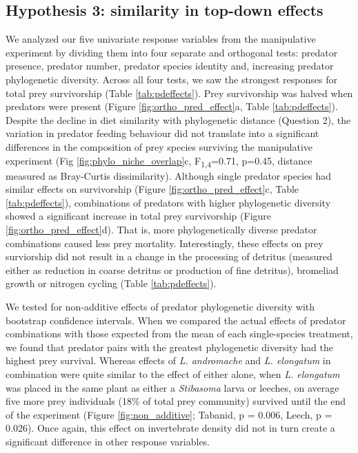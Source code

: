 \subsection{Hypothesis 3: similarity in top-down
effects}\label{hypothesis-3-similarity-in-top-down-effects}

We analyzed our five univariate response variables from the manipulative
experiment by dividing them into four separate and orthogonal tests:
predator presence, predator number, predator species identity and,
increasing predator phylogenetic diversity. Across all four tests, we
saw the strongest responses for total prey survivorship (Table \ref{tab:pdeffects}). Prey
survivorship was halved when predators were present (Figure \ref{fig:ortho_pred_effect}a, Table \ref{tab:pdeffects}). Despite the decline in diet similarity with phylogenetic distance
(Question 2), the variation in predator feeding behaviour did not
translate into a significant differences in the composition of prey
species surviving the manipulative experiment (Fig \ref{fig:phylo_niche_overlap}c,
F\textsubscript{1,4}=0.71, p=0.45, distance measured as Bray-Curtis
dissimilarity). Although single predator species had similar effects on
survivorship (Figure \ref{fig:ortho_pred_effect}c, Table \ref{tab:pdeffects}), combinations of predators with higher
phylogenetic diversity showed a significant increase in total prey
survivorship (Figure \ref{fig:ortho_pred_effect}d). That is, more phylogenetically diverse predator
combinations caused less prey mortality. Interestingly, these effects on
prey surviorship did not result in a change in the processing of
detritus (measured either as reduction in coarse detritus or production
of fine detritus), bromeliad growth or nitrogen cycling (Table \ref{tab:pdeffects}).

We tested for non-additive effects of predator phylogenetic diversity
with bootstrap confidence intervals. When we compared the actual effects
of predator combinations with those expected from the mean of each
single-species treatment, we found that predator pairs with the greatest
phylogenetic diversity had the highest prey survival. Whereas effects of
\emph{L. andromache} and \emph{L. elongatum} in combination were quite
similar to the effect of either alone, when \emph{L. elongatum} was
placed in the same plant as either a \emph{Stibasoma} larva or leeches,
on average five more prey individuals (18\% of total prey community)
survived until the end of the experiment (Figure \ref{fig:non_additive}; Tabanid, p = 0.006,
Leech, p = 0.026). Once again, this effect on invertebrate density did
not in turn create a significant difference in other response variables.

